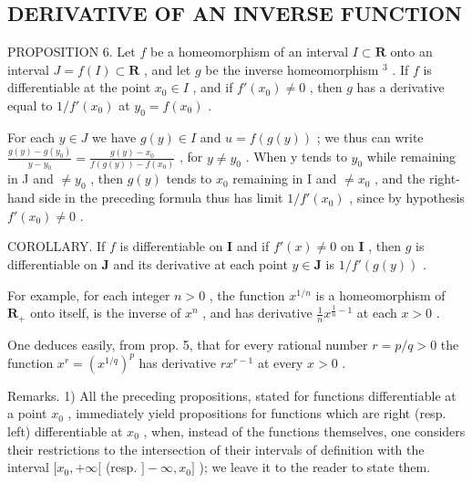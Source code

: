\subsection{DERIVATIVE OF AN INVERSE FUNCTION}

PROPOSITION 6. Let \(f\) be a homeomorphism of an interval \(I \subset \mathbf{R}\) onto an interval \(J = f(I) \subset \mathbf{R}\) , and let \(g\) be the inverse homeomorphism \(^3\) . If \(f\) is differentiable at the point \(x_0 \in I\) , and if \(f'(x_0) \neq 0\) , then \(g\) has a derivative equal to \(1/f'(x_0)\) at \(y_0 = f(x_0)\) .

For each \(y \in J\) we have \(g(y) \in I\) and \(u = f(g(y))\) ; we thus can write \(\frac{g(y) - g(y_0)}{y - y_0} = \frac{g(y) - x_0}{f(g(y)) - f(x_0)}\) , for \(y \neq y_0\) . When y tends to \(y_0\) while remaining in J and \(\neq y_0\) , then \(g(y)\) tends to \(x_0\) remaining in I and \(\neq x_0\) , and the right-hand side in the preceding formula thus has limit \(1/f'(x_0)\) , since by hypothesis \(f'(x_0) \neq 0\) .

COROLLARY. If \(f\) is differentiable on \(\mathbf{I}\) and if \(f'(x) \neq 0\) on \(\mathbf{I}\) , then \(g\) is differentiable on \(\mathbf{J}\) and its derivative at each point \(y \in \mathbf{J}\) is \(1 / f'(g(y))\) .

For example, for each integer \(n > 0\) , the function \(x^{1 / n}\) is a homeomorphism of \(\mathbf{R}_+\) onto itself, is the inverse of \(x^n\) , and has derivative \(\frac{1}{n} x^{\frac{1}{n} - 1}\) at each \(x > 0\) .

One deduces easily, from prop. 5, that for every rational number \(r = p / q > 0\) the function \(x^{r} = (x^{1 / q})^{p}\) has derivative \(rx^{r - 1}\) at every \(x > 0\) .

Remarks. 1) All the preceding propositions, stated for functions differentiable at a point \(x_0\) , immediately yield propositions for functions which are right (resp. left) differentiable at \(x_0\) , when, instead of the functions themselves, one considers their restrictions to the intersection of their intervals of definition with the interval \([x_0, +\infty[\) (resp. \(] - \infty, x_0]\) ); we leave it to the reader to state them.

